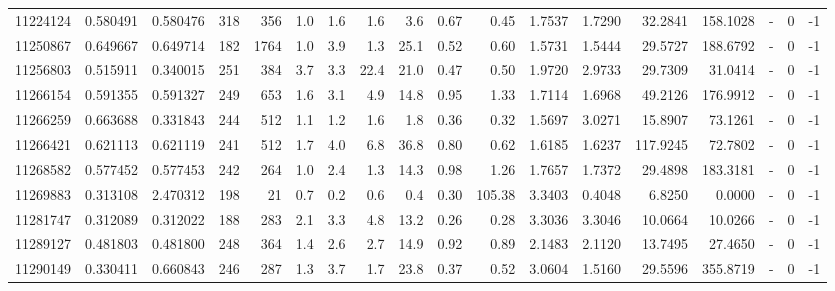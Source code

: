 \begin{tabular}{rrrrrrrrrrrrrrrlrr}
  11224124 & 0.580491 &   0.580476 &  318 &  356 &      1.0 &      1.6 &     1.6 &      3.6 &       0.67 &        0.45 &  1.7537 &  1.7290 &   32.2841 &  158.1028 &             - &        0 &         -1 \\
  11250867 & 0.649667 &   0.649714 &  182 & 1764 &      1.0 &      3.9 &     1.3 &     25.1 &       0.52 &        0.60 &  1.5731 &  1.5444 &   29.5727 &  188.6792 &             - &        0 &         -1 \\
  11256803 & 0.515911 &   0.340015 &  251 &  384 &      3.7 &      3.3 &    22.4 &     21.0 &       0.47 &        0.50 &  1.9720 &  2.9733 &   29.7309 &   31.0414 &             - &        0 &         -1 \\
  11266154 & 0.591355 &   0.591327 &  249 &  653 &      1.6 &      3.1 &     4.9 &     14.8 &       0.95 &        1.33 &  1.7114 &  1.6968 &   49.2126 &  176.9912 &             - &        0 &         -1 \\
  11266259 & 0.663688 &   0.331843 &  244 &  512 &      1.1 &      1.2 &     1.6 &      1.8 &       0.36 &        0.32 &  1.5697 &  3.0271 &   15.8907 &   73.1261 &             - &        0 &         -1 \\
  11266421 & 0.621113 &   0.621119 &  241 &  512 &      1.7 &      4.0 &     6.8 &     36.8 &       0.80 &        0.62 &  1.6185 &  1.6237 &  117.9245 &   72.7802 &             - &        0 &         -1 \\
  11268582 & 0.577452 &   0.577453 &  242 &  264 &      1.0 &      2.4 &     1.3 &     14.3 &       0.98 &        1.26 &  1.7657 &  1.7372 &   29.4898 &  183.3181 &             - &        0 &         -1 \\
  11269883 & 0.313108 &   2.470312 &  198 &   21 &      0.7 &      0.2 &     0.6 &      0.4 &       0.30 &      105.38 &  3.3403 &  0.4048 &    6.8250 &    0.0000 &             - &        0 &         -1 \\
  11281747 & 0.312089 &   0.312022 &  188 &  283 &      2.1 &      3.3 &     4.8 &     13.2 &       0.26 &        0.28 &  3.3036 &  3.3046 &   10.0664 &   10.0266 &             - &        0 &         -1 \\
  11289127 & 0.481803 &   0.481800 &  248 &  364 &      1.4 &      2.6 &     2.7 &     14.9 &       0.92 &        0.89 &  2.1483 &  2.1120 &   13.7495 &   27.4650 &             - &        0 &         -1 \\
  11290149 & 0.330411 &   0.660843 &  246 &  287 &      1.3 &      3.7 &     1.7 &     23.8 &       0.37 &        0.52 &  3.0604 &  1.5160 &   29.5596 &  355.8719 &             - &        0 &         -1 \\

\end{tabular}
